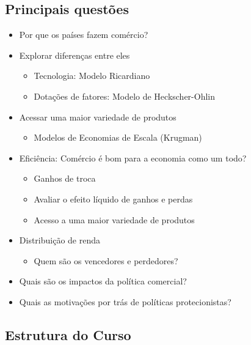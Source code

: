 \documentclass[a4paper,12pt]{article}[abntex2]
\begin{document}
\subsection*{\textbf{Principais questões}}
\begin{itemize}
    \item Por que os países fazem comércio?
    \item Explorar diferenças entre eles\begin{itemize}
        \item Tecnologia: Modelo Ricardiano
        \item Dotações de fatores: Modelo de Heckscher-Ohlin
    \end{itemize}
    \item Acessar uma maior variedade de produtos \begin{itemize}
        \item Modelos de Economias de Escala (Krugman)
    \end{itemize}
    \item  Eficiência: Comércio é bom para a economia como um todo? \begin{itemize}
        \item Ganhos de troca
        \item Avaliar o efeito líquido de ganhos e perdas
        \item Acesso a uma maior variedade de produtos
    \end{itemize}
    \item Distribuição de renda\begin{itemize}
        \item Quem são os vencedores e perdedores?
    \end{itemize}
    \item Quais são os impactos da política comercial?
    \item     Quais as motivações por trás de políticas protecionistas?
\end{itemize}

\subsection*{\textbf{Estrutura do Curso}}
\end{document}
